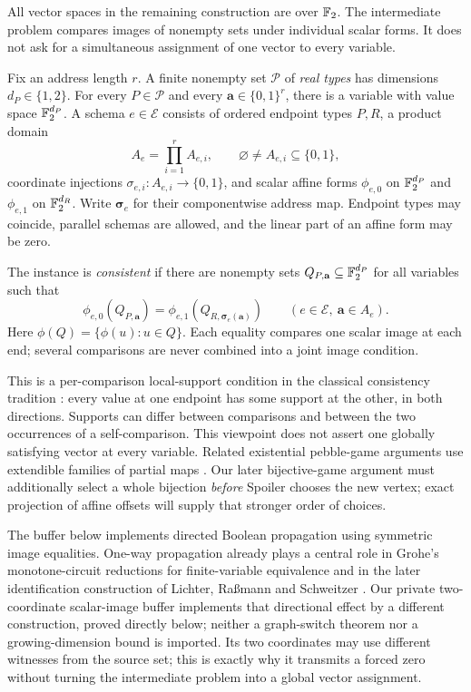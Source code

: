 All vector spaces in the remaining construction are over $\mathbb F_2$. The
intermediate problem compares images of nonempty sets under individual
scalar forms. It does not ask for a simultaneous assignment of one vector
to every variable.

\begin{definition}
\label{def:scalar-images}
Fix an address length $r$. A finite nonempty set $\mathcal P$ of
\emph{real types} has dimensions $d_P\in\{1,2\}$. For every $P\in\mathcal P$
and every $\mathbf a\in\{0,1\}^r$, there is a variable with value space
$\mathbb F_2^{d_P}$. A schema $e\in\mathcal E$ consists of ordered endpoint types
$P,R$, a product domain
\[
 A_e=\prod_{i=1}^r A_{e,i},\qquad
 \varnothing\ne A_{e,i}\subseteq\{0,1\},
\]
coordinate injections $\sigma_{e,i}:A_{e,i}\to\{0,1\}$, and scalar
affine forms $\phi_{e,0}$ on $\mathbb F_2^{d_P}$ and $\phi_{e,1}$ on $\mathbb F_2^{d_R}$.
Write $\boldsymbol\sigma_e$ for their componentwise address map.
Endpoint types may coincide, parallel schemas are allowed, and the
linear part of an affine form may be zero.

The instance is \emph{consistent} if there are nonempty sets
$Q_{P,\mathbf a}\subseteq\mathbb F_2^{d_P}$ for all variables such that
\begin{equation}\label{eq:scalar-images}
 \phi_{e,0}(Q_{P,\mathbf a})
 =\phi_{e,1}(Q_{R,\boldsymbol\sigma_e(\mathbf a)})
 \qquad(e\in\mathcal E,\ \mathbf a\in A_e).
\end{equation}
Here $\phi(Q)=\{\phi(u):u\in Q\}$. Each equality compares one scalar
image at each end; several comparisons are never combined into a joint
image condition.
\end{definition}

This is a per-comparison local-support condition in the classical
consistency tradition \citep[Sections~4 and~6]{Mackworth1977}:
every value at one endpoint has some support at the other, in both
directions. Supports can differ between comparisons and between the
two occurrences of a self-comparison. This viewpoint does not assert
one globally satisfying vector at every variable.
Related existential pebble-game arguments use extendible families of
partial maps \citep[Definition~4]{Berkholz2013}. Our later bijective-game
argument must additionally select a whole bijection \emph{before}
Spoiler chooses the new vertex; exact projection of affine offsets
will supply that stronger order of choices.

The buffer below implements directed Boolean propagation using symmetric
image equalities. One-way propagation already plays a central role in
Grohe's monotone-circuit reductions for finite-variable equivalence
\citep[author manuscript, Lemma~14 and Section~5.4]{Grohe1999}
and in the later identification
construction of Lichter, Ra{\ss}mann and Schweitzer
\citep[Section~5]{LichterRassmannSchweitzer2025}.
Our private two-coordinate scalar-image buffer implements that directional
effect by a different construction, proved directly below; neither a
graph-switch theorem nor a growing-dimension bound is imported.
Its two coordinates may use different witnesses from
the source set; this is exactly why it transmits a forced zero without
turning the intermediate problem into a global vector assignment.

